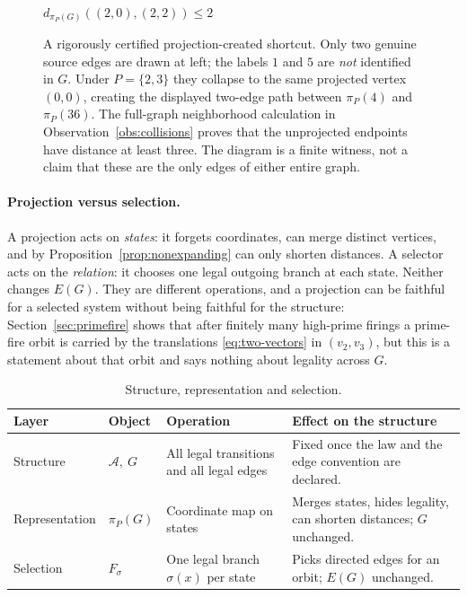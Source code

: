 \documentclass[11pt,a4paper]{article}
\theoremstyle{definition}\newtheorem{definition}[theorem]{Definition}
\newcommand{\A}{\mathcal A}
\begin{document}
\begin{figure}[!htbp]
\begin{minipage}[c]{.52\textwidth}
\\[3pt]
 {\footnotesize $d_{\pi_P(G)}((2,0),(2,2))\leq 2$}
\end{minipage}
\caption{A rigorously certified projection-created shortcut. Only two genuine source edges are drawn at left; the labels $1$ and $5$ are \emph{not} identified in $G$. Under $P=\{2,3\}$ they collapse to the same projected vertex $(0,0)$, creating the displayed two-edge path between $\pi_P(4)$ and $\pi_P(36)$. The full-graph neighborhood calculation in Observation~\ref{obs:collisions} proves that the unprojected endpoints have distance at least three. The diagram is a finite witness, not a claim that these are the only edges of either entire graph.}
\label{fig:collision}
\end{figure}

\paragraph{Projection versus selection.} A projection acts on \emph{states}: it forgets coordinates, can merge distinct vertices, and by Proposition~\ref{prop:nonexpanding} can only shorten distances. A selector acts on the \emph{relation}: it chooses one legal outgoing branch at each state. Neither changes $E(G)$. They are different operations, and a projection can be faithful for a selected system without being faithful for the structure: Section~\ref{sec:primefire} shows that after finitely many high-prime firings a prime-fire orbit is carried by the translations \eqref{eq:two-vectors} in $(v_2,v_3)$, but this is a statement about that orbit and says nothing about legality across $G$.

\begin{table}[htbp]
\centering\small
\caption{Structure, representation and selection.}
\label{tab:three}
\begin{tabularx}{\textwidth}{@{}p{24mm}p{20mm}X X@{}}
\toprule
\textbf{Layer} & \textbf{Object} & \textbf{Operation} & \textbf{Effect on the structure}\\
\midrule
Structure & $\A,\ G$ & All legal transitions and all legal edges & Fixed once the law and the edge convention are declared.\\
Representation & $\pi_P(G)$ & Coordinate map on states & Merges states, hides legality, can shorten distances; $G$ unchanged.\\
Selection & $F_\sigma$ & One legal branch $\sigma(x)$ per state & Picks directed edges for an orbit; $E(G)$ unchanged.\\
\bottomrule
\end{tabularx}
\end{table}
\end{document}
